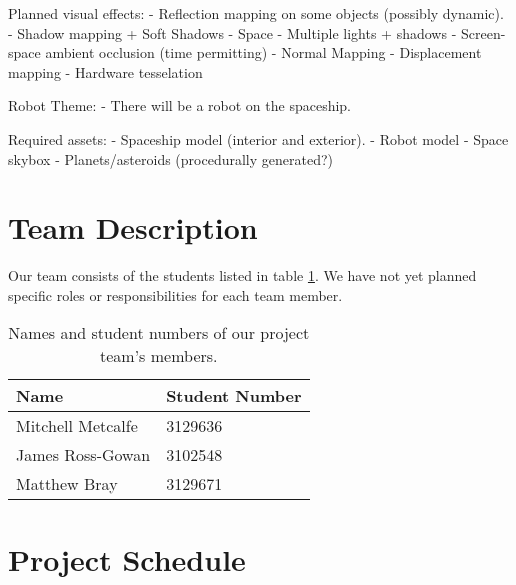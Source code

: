 \documentclass[11pt]{scrartcl} %
\begin{document}
    Planned visual effects:
        - Reflection mapping on some objects (possibly dynamic).
        - Shadow mapping + Soft Shadows
        - Space
        - Multiple lights + shadows
        - Screen-space ambient occlusion (time permitting)
        - Normal Mapping
        - Displacement mapping
        - Hardware tesselation

    Robot Theme:
        - There will be a robot on the spaceship.

    Required assets:
        - Spaceship model (interior and exterior).
        - Robot model
        - Space skybox
        - Planets/asteroids (procedurally generated?)


\section*{Team Description}
    Our team consists of the students listed in table \ref{table:teamMembers}.
    We have not yet planned specific roles or responsibilities for each team
    member.

    \begin{table}[h]
    \centering
        \begin{tabular}{@{}ll@{}}
        \toprule
            Name & Student Number \\ \midrule
            Mitchell Metcalfe & 3129636 \\
            James Ross-Gowan & 3102548 \\
            Matthew Bray & 3129671 \\ \bottomrule
        \end{tabular}
        \caption[Team members]{Names and student numbers of our project team's members.}
        \label{table:teamMembers}
    \end{table}

\section*{Project Schedule}
\end{document}
